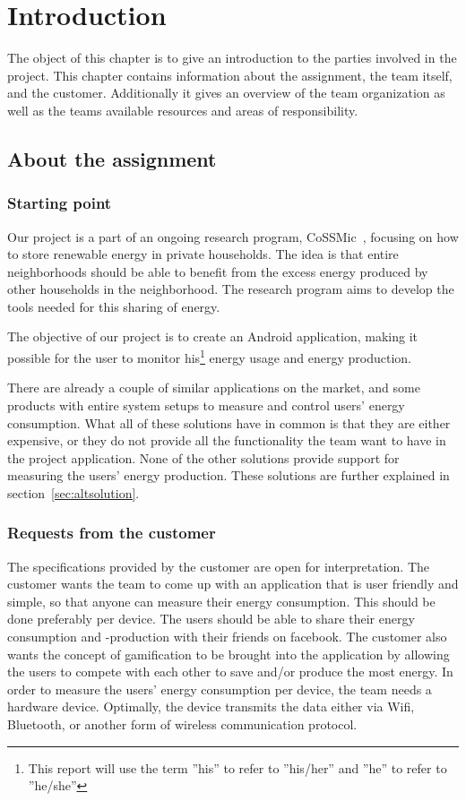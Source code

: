 \chapter{Introduction}
The object of this chapter is to give an introduction to the parties involved in the project. This chapter contains information about the assignment, the team itself, and the customer.
Additionally it gives an overview of the team organization as well as the teams available resources and areas of responsibility.

\newpage
\section{About the assignment}
\subsection{Starting point}
Our project is a part of an ongoing research program, CoSSMic~\cite{cossmic}, focusing on how to store renewable energy in private households. 
The idea is that entire neighborhoods should be able to benefit from the excess energy produced by other households in the neighborhood. 
The research program aims to develop the tools needed for this sharing of energy. 

The objective of our project is to create an Android application, making it possible for the user to monitor his\footnote{This report will use the term ''his'' to refer to ''his/her'' and ''he'' to refer to ''he/she''} 
energy usage and energy production. 

There are already a couple of similar applications on the market, and some products with entire system setups to measure and control users' energy consumption. 
What all of these solutions have in common is that they are either expensive, or they do not provide all the functionality the team want to have in the project application. 
None of the other solutions provide support for measuring the users' energy production. These solutions are further explained in section~\ref{sec:altsolution}.

\subsection{Requests from the customer}
The specifications provided by the customer are open for interpretation. The customer wants the team to come up with an application that is user friendly and simple, 
so that anyone can measure their energy consumption. This should be done preferably per device. The users should be able to share their energy consumption and -production with their friends on \gls{facebook}. 
The customer also wants the concept of \gls{gamification} to be brought into the application by allowing the users to compete with each other to save and/or produce the most energy. 
In order to measure the users' energy consumption per device, the team needs a hardware device. Optimally, the device transmits the data either via Wifi, Bluetooth, or another form of wireless communication protocol. 

